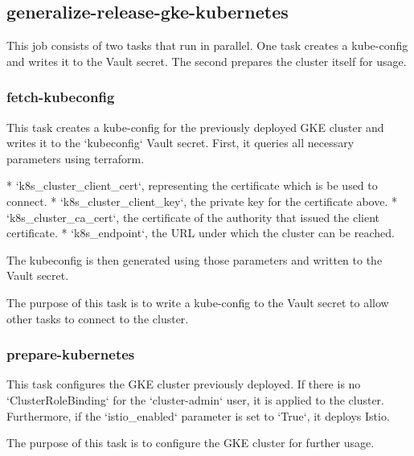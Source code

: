 \subsection{generalize-release-gke-kubernetes}\label{subsec:generalize-release-gke-kubernetes}

This job consists of two tasks that run in parallel.
One task creates a kube-config and writes it to the Vault secret.
The second prepares the cluster itself for usage.

\subsubsection{fetch-kubeconfig}\label{subsubsec:fetch-kubeconfig}

This task creates a kube-config for the previously deployed GKE cluster and writes it to the `kubeconfig` Vault secret.
First, it queries all necessary parameters using terraform.

* `k8s_cluster_client_cert`, representing the certificate which is be used to connect.
* `k8s_cluster_client_key`, the private key for the certificate above.
*  `k8s_cluster_ca_cert`, the certificate of the authority that issued the client certificate.
*  `k8s_endpoint`, the URL under which the cluster can be reached.

The kubeconfig is then generated using those parameters and written to the Vault secret.

The purpose of this task is to write a kube-config to the Vault secret to allow other tasks to connect to the cluster.

\subsubsection{prepare-kubernetes}\label{subsubsec:prepare-kubernetes}

This task configures the GKE cluster previously deployed.
If there is no `ClusterRoleBinding` for the `cluster-admin` user, it is applied to the cluster.
Furthermore, if the `{istio_enabled}` parameter is set to `True`, it deploys Istio.

The purpose of this task is to configure the GKE cluster for further usage.
